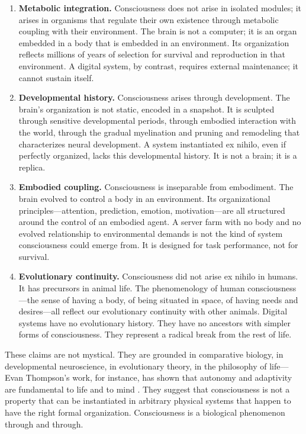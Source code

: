 \documentclass[11pt]{article}
\begin{document}
\begin{enumerate}
\item \textbf{Metabolic integration.} Consciousness does not arise in isolated modules; it arises in organisms that regulate their own existence through metabolic coupling with their environment. The brain is not a computer; it is an organ embedded in a body that is embedded in an environment. Its organization reflects millions of years of selection for survival and reproduction in that environment. A digital system, by contrast, requires external maintenance; it cannot sustain itself.

\item \textbf{Developmental history.} Consciousness arises through development. The brain's organization is not static, encoded in a snapshot. It is sculpted through sensitive developmental periods, through embodied interaction with the world, through the gradual myelination and pruning and remodeling that characterizes neural development. A system instantiated ex nihilo, even if perfectly organized, lacks this developmental history. It is not a brain; it is a replica.

\item \textbf{Embodied coupling.} Consciousness is inseparable from embodiment. The brain evolved to control a body in an environment. Its organizational principles---attention, prediction, emotion, motivation---are all structured around the control of an embodied agent. A server farm with no body and no evolved relationship to environmental demands is not the kind of system consciousness could emerge from. It is designed for task performance, not for survival.

\item \textbf{Evolutionary continuity.} Consciousness did not arise ex nihilo in humans. It has precursors in animal life. The phenomenology of human consciousness---the sense of having a body, of being situated in space, of having needs and desires---all reflect our evolutionary continuity with other animals. Digital systems have no evolutionary history. They have no ancestors with simpler forms of consciousness. They represent a radical break from the rest of life.
\end{enumerate}

These claims are not mystical. They are grounded in comparative biology, in developmental neuroscience, in evolutionary theory, in the philosophy of life---Evan Thompson's work, for instance, has shown that autonomy and adaptivity are fundamental to life and to mind \citep{thompson2007}. They suggest that consciousness is not a property that can be instantiated in arbitrary physical systems that happen to have the right formal organization. Consciousness is a biological phenomenon through and through.
\end{document}
